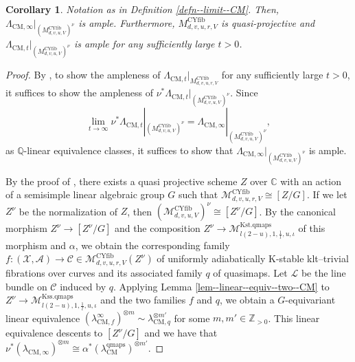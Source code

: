 \documentclass[12pt,twoside]{amsart}
\newtheorem{cor}[thm]{Corollary}
\theoremstyle{definition}
\begin{document}
\begin{cor}\label{cor--final}
 Notation as in Definition \ref{defn--limit--CM}.  
 Then, $\Lambda_{\mathrm{CM},\infty}|_{(M^{\mathrm{CYfib}}_{d,v,u,V})^\nu}$ is ample.
 Furthermore, $M^{\mathrm{CYfib}}_{d,v,u,r,V}$ is quasi-projective and $\Lambda_{\mathrm{CM},t}|_{(M^{\mathrm{CYfib}}_{d,v,u,V})^\nu}$ is ample for any sufficiently large $t>0$.
\end{cor}

\begin{proof}
By \cite[Tag 0GFB]{stacksproject-chap98}, to show the ampleness of $\Lambda_{\mathrm{CM},t}|_{M^{\mathrm{CYfib}}_{d,v,u,r,V}}$ for any sufficiently large $t>0$, it suffices to show the ampleness of $\nu^*\Lambda_{\mathrm{CM},t}|_{(M^{\mathrm{CYfib}}_{d,v,u,V})^\nu}$.
Since \[\lim_{t\to\infty}\nu^*\Lambda_{\mathrm{CM},t}|_{(M^{\mathrm{CYfib}}_{d,v,u,V})^\nu}=\Lambda_{\mathrm{CM},\infty}|_{(M^{\mathrm{CYfib}}_{d,v,u,V})^\nu},\]
as $\mathbb{Q}$-linear equivalence classes, it suffices to show that $\Lambda_{\mathrm{CM},\infty}|_{(M^{\mathrm{CYfib}}_{d,v,u,V})^\nu}$ is ample.

By the proof of \cite[Theorem 5.1]{HH}, there exists a quasi projective scheme $Z$ over $\mathbb{C}$ with an action of a semisimple linear algebraic group $G$ such that $\mathcal{M}^{\mathrm{CYfib}}_{d,v,u,r,V}\cong[Z/G]$.
If we let $Z^\nu$ be the normalization of $Z$, then $(\mathcal{M}^{\mathrm{CYfib}}_{d,v,u,V})^\nu\cong[Z^\nu/G]$.
By the canonical morphism $Z^\nu\to [Z^\nu/G]$ and the composition $Z^\nu\to \mathcal{M}_{l(2-u),1,\frac{1}{l},u,\iota}^{\mathrm{Kst.qmaps}}$ of this morphism and $\alpha$, we obtain the corresponding family $f\colon (\mathcal{X},\mathcal{A})\to \mathcal{C}\in\mathcal{M}^{\mathrm{CYfib}}_{d,v,u,r,V}(Z^\nu)$ of uniformly adiabatically K-stable klt--trivial fibrations over curves and its associated family $q$ of quasimaps.
Let $\mathcal{L}$ be the line bundle on $\mathcal{C}$ induced by $q$. 
Applying Lemma \ref{lem--linear--equiv--two--CM} to $Z^\nu\to\mathcal{M}_{l(2-u),1,\frac{1}{l},u,\iota}^{\mathrm{Kss.qmaps}}$ and the two families $f$ and $q$, we obtain a $G$-equivariant linear equivalence $(\lambda_{\mathrm{CM},f}^{\infty})^{\otimes m}\sim\lambda_{\mathrm{CM},q}^{\otimes m'}$ for some $m,m'\in\mathbb{Z}_{>0}$. 
This linear equivalence descents to $[Z^\nu/G]$ and we have that $\nu^*(\lambda_{\mathrm{CM},\infty})^{\otimes m}\cong \alpha^*(\lambda^{\mathrm{qmaps}}_{\mathrm{CM}})^{\otimes m'}$.


\end{proof}
\end{document}
